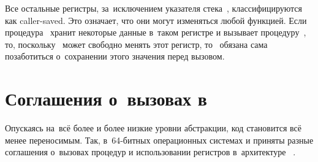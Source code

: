 Все остальные регистры, за~исключением указателя стека~, классифицируются как \textenglish{caller-saved}. Это означает, что они могут изменяться любой функцией. Если процедура~ хранит некоторые данные в~таком регистре и вызывает процедуру~, то, поскольку~ может свободно менять этот регистр, то~ обязана сама позаботиться о~сохранении этого значения перед вызовом.



\section{Соглашения о~вызовах в~~}
Опускаясь на~всё более и более низкие уровни абстракции, код становится всё менее переносимым. Так, в~64-битных операционных системах  и  приняты разные соглашения о~вызовах процедур и использовании регистров в~архитектуре ~.



